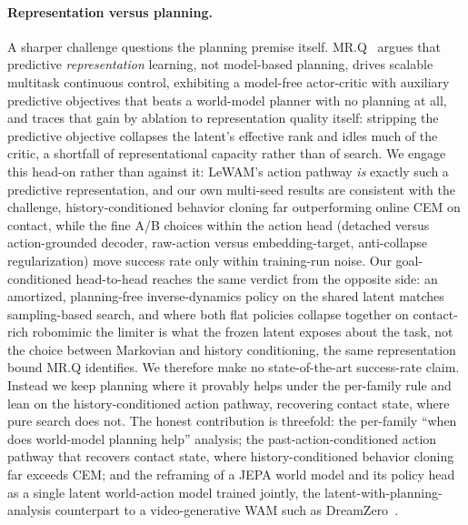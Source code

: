 \paragraph{Representation versus planning.}
A sharper challenge questions the planning premise itself. MR.Q~\cite{mrq} argues that predictive \emph{representation} learning, not model-based planning, drives scalable multitask continuous control, exhibiting a model-free actor-critic with auxiliary predictive objectives that beats a world-model planner with no planning at all, and traces that gain by ablation to representation quality itself: stripping the predictive objective collapses the latent's effective rank and idles much of the critic, a shortfall of representational capacity rather than of search. We engage this head-on rather than against it: LeWAM's action pathway \emph{is} exactly such a predictive representation, and our own multi-seed results are consistent with the challenge, history-conditioned behavior cloning far outperforming online CEM on contact, while the fine A/B choices within the action head (detached versus action-grounded decoder, raw-action versus embedding-target, anti-collapse regularization) move success rate only within training-run noise. Our goal-conditioned head-to-head reaches the same verdict from the opposite side: an amortized, planning-free inverse-dynamics policy on the shared latent matches sampling-based search, and where both flat policies collapse together on contact-rich robomimic the limiter is what the frozen latent exposes about the task, not the choice between Markovian and history conditioning, the same representation bound MR.Q identifies. We therefore make no state-of-the-art success-rate claim. Instead we keep planning where it provably helps under the per-family rule and lean on the history-conditioned action pathway, recovering contact state, where pure search does not. The honest contribution is threefold: the per-family ``when does world-model planning help'' analysis; the past-action-conditioned action pathway that recovers contact state, where history-conditioned behavior cloning far exceeds CEM; and the reframing of a JEPA world model and its policy head as a single latent world-action model trained jointly, the latent-with-planning-analysis counterpart to a video-generative WAM such as DreamZero~\cite{dreamzero}.

